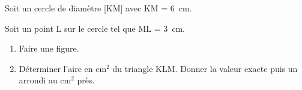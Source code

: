 
\medskip

Soit un cercle de diamètre [KM] avec KM = 6~cm.

Soit un point L sur le cercle tel que ML = 3~cm.

\medskip

\begin{enumerate}
\item Faire une figure.
\item Déterminer l'aire en cm$^2$ du triangle KLM. Donner la valeur exacte puis un arrondi au cm$^2$ près.
\end{enumerate}

\vspace{0,5cm}

